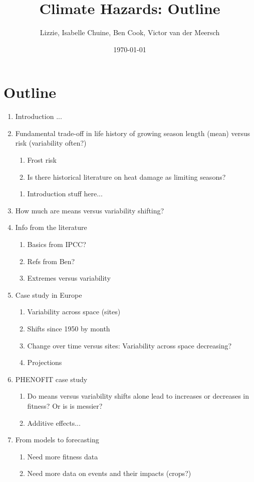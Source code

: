 \documentclass[11pt,letter]{article}
\begin{document}

\renewcommand{\refname}{\CHead{}}

\title{Climate Hazards: Outline}
\author{Lizzie, Isabelle Chuine, Ben Cook, Victor van der Meersch}
\date{\today}
\maketitle

\section{Outline}

\begin{enumerate}
\item Introduction ...
\item Fundamental trade-off in life history of growing season length (mean) versus risk (variability often?)
\begin{enumerate}
\item Frost risk
\item Is there historical literature on heat damage as limiting seasons?
\end{enumerate}
\begin{enumerate}
\item Introduction stuff here... 
\end{enumerate}
\item How much are means versus variability shifting?
\item Info from the literature
\begin{enumerate}
\item Basics from IPCC?
\item Refs from Ben?
\item Extremes versus variability
\end{enumerate}
\item Case study in Europe
\begin{enumerate}
\item Variability across space (sites)
\item Shifts since 1950 by month 
\item Change over time versus sites: Variability across space decreasing?
\item Projections
\end{enumerate}
\item PHENOFIT case study
\begin{enumerate}
\item Do means versus variability shifts alone lead to increases or decreases in fitness? Or is is messier?
\item Additive effects... 
\end{enumerate}
\item From models to forecasting
\begin{enumerate}
\item Need more fitness data
\item Need more data on events and their impacts (crops?)
\end{enumerate}
\end{enumerate}
\end{document}
